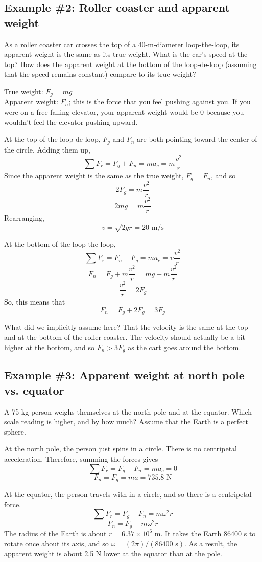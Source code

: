 \subsection{Example \#2: Roller coaster and apparent weight}
As a roller coaster car crosses the top of a 40-m-diameter loop-the-loop, its apparent weight is the same as its true weight. What is the car's speed at the top? How does the apparent weight at the bottom of the loop-de-loop (assuming that the speed remains constant) compare to its true weight?

True weight: $F_g=mg$\\
Apparent weight: $F_n$; this is the force that you feel pushing against you. If you were on a free-falling elevator, your apparent weight would be 0 because you wouldn't feel the elevator pushing upward. 

At the top of the loop-de-loop, $F_g$ and $F_n$ are both pointing toward the center of the circle. Adding them up,
$$\sum F_r=F_g+F_n=ma_c=m\frac{v^2}{r}$$
Since the apparent weight is the same as the true weight, $F_g=F_n$, and so
$$2F_g=m\frac{v^2}{r}$$
$$2mg=m\frac{v^2}{r}$$
Rearranging,
$$\boxed{v=\sqrt{2gr}=20\mbox{ m/s}}$$

At the bottom of the loop-the-loop,
$$\sum F_r=F_n-F_g=ma_c=v\frac{v^2}{r}$$
$$F_n=F_g+m\frac{v^2}{r}=mg+m\frac{v^2}{r}$$
$$\frac{v^2}{r}=2F_g$$
So, this means that
$$\boxed{F_n=F_g+2F_g=3F_g}$$

What did we implicitly assume here? That the velocity is the same at the top and at the bottom of the roller coaster. The velocity should actually be a bit higher at the bottom, and so $F_n>3F_g$ as the cart goes around the bottom.

\subsection{Example \#3: Apparent weight at north pole vs. equator}
A 75 kg person weighs themselves at the north pole and at the equator. Which scale reading is higher, and by how much? Assume that the Earth is a perfect sphere.

At the north pole, the person just spins in a circle. There is no centripetal acceleration. Therefore, summing the forces gives
$$\sum F_r=F_g-F_n=ma_c=0$$
$$F_n=F_g=ma=735.8\mbox{ N}$$

At the equator, the person travels with in a circle, and so there is a centripetal force.
$$\sum F_r=F_g-F_n=m\omega^2r$$
$$F_n=F_g-m\omega^2r$$
The radius of the Earth is about $r=6.37\times 10^6\mbox{ m}$. It takes the Earth 86400 s to rotate once about its axis, and so $\omega=(2\pi)/(86400\mbox{ s})$. As a result, the apparent weight is about 2.5 N lower at the equator than at the pole.

\clearpage
